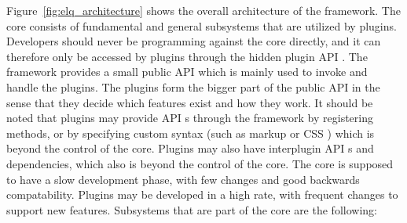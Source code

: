 \documentclass[a4paper,11pt]{kth-mag}
\newcommand\abbr[2][]{\uppercase{#2}\ifthenelse{\equal{#1}{}}%
                     {}{#1}}
\begin{document}
        

        Figure~\ref{fig:elq_architecture} shows the overall architecture of the framework.
        The core consists of fundamental and general subsystems that are utilized by plugins.
        Developers should never be programming against the core directly, and it can therefore only be accessed by plugins through the hidden plugin \abbr{api}.
        The framework provides a small public \abbr{api} which is mainly used to invoke and handle the plugins.
        The plugins form the bigger part of the public \abbr{api} in the sense that they decide which features exist and how they work.
        It should be noted that plugins may provide \abbr[s]{api} through the framework by registering methods, or by specifying custom syntax (such as markup or \abbr{css}) which is beyond the control of the core.
        Plugins may also have interplugin \abbr[s]{api} and dependencies, which also is beyond the control of the core.
        The core is supposed to have a slow development phase, with few changes and good backwards compatability.
        Plugins may be developed in a high rate, with frequent changes to support new features.
        Subsystems that are part of the core are the following:
\end{document}
